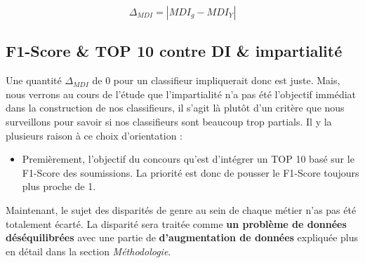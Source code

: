 $$ \Delta_{MDI} = | MDI_{g}- MDI_{Y} | $$

\subsection{F1-Score \& TOP 10 contre DI \& impartialité} \hfill
\newline

Une quantité $\Delta_{MDI}$ de $0$ pour un classifieur impliquerait donc  est juste. Mais, nous verrons au cours de l'étude que l'impartialité n'a pas été l'objectif immédiat dans la construction de nos classifieurs, il s'agit là plutôt d'un critère que nous surveillons pour savoir si nos classifieurs sont beaucoup trop partials. Il y la plusieurs raison à ce choix d'orientation :

\begin{itemize}
\item Premièrement, l'objectif du concours qu'est d'intégrer un TOP 10 basé sur le F1-Score des soumissions. La priorité est donc de pousser le F1-Score toujours plus proche de 1.
\end{itemize}

\hfill

Maintenant, le sujet des disparités de genre au sein de chaque métier n'as pas été totalement écarté. La disparité sera traitée comme \textbf{un problème de données déséquilibrées} avec une partie de \textbf{d'augmentation de données} expliquée plus en détail dans la section \emph{Méthodologie}.

